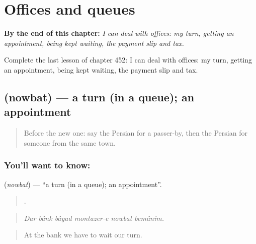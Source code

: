
\chapter{Offices and queues}
\label{ch:fa-offices-and-queues}

\begin{chapteropening}
\textbf{By the end of this chapter:} \emph{I can deal with offices: my turn, getting an appointment, being kept waiting, the payment slip and tax.}

Complete the last lesson of chapter 452: I can deal with offices: my turn, getting an appointment, being kept waiting, the payment slip and tax.
\end{chapteropening}

\section[\texorpdfstring{\fa{نوبت} (nowbat)}{نوبت (nowbat)}]{ (nowbat) — a turn (in a queue); an appointment}

\label{lesson:FA-C452-nobat}



\begin{quote}
Before the new one: say the Persian for a passer-by, then the Persian for someone from the same town.
\end{quote}

\subsection*{You'll want to know: }
\textbf{} (\emph{nowbat}) — \textquotedblleft{}a turn (in a queue); an appointment\textquotedblright{}.

\begin{quote}
     .
\end{quote}

\begin{quote}
\emph{Dar bânk bâyad montazer-e nowbat bemânim.}
\end{quote}

\begin{quote}
At the bank we have to wait our turn.
\end{quote}

